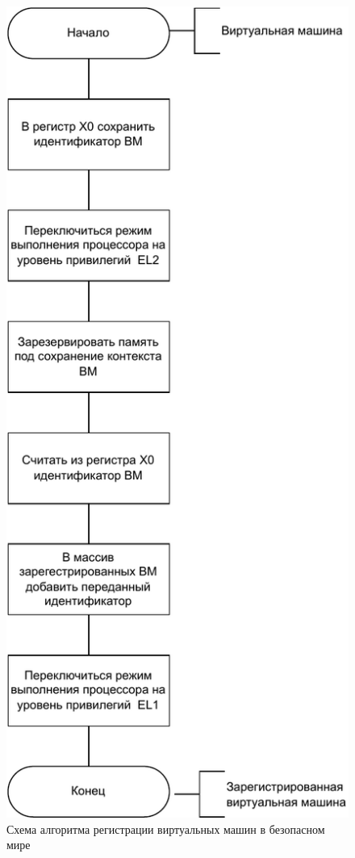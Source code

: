 \begin{figure}[h]
	\centering
	\includegraphics[scale=0.6]{img/register-vm-algo.pdf}
	\caption{Схема алгоритма регистрации виртуальных машин в безопасном мире}
	\label{fig:move-pte-algo}
\end{figure}

